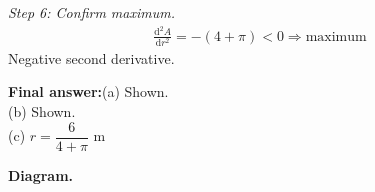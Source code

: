 \documentclass[11pt]{article}
\begin{document}
\textit{Step 6: Confirm maximum.}
\[\begin{gathered}
\frac{\mathrm{d}^2A}{\mathrm{d}r^2} = -(4 + \pi) < 0 \Rightarrow \text{maximum}
\end{gathered}\]
Negative second derivative.

\begin{answerbox}
\textbf{Final answer:}\quad (a) Shown. \\[3pt]  (b) Shown. \\[3pt]  (c) \(\displaystyle  r = \dfrac{6}{4 + \pi} \) m
\end{answerbox}
\textbf{Diagram.}

\begin{center}
\end{center}
\end{document}
